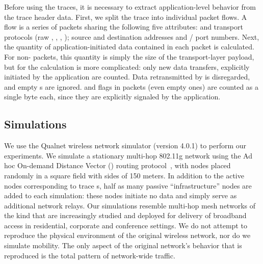 \documentclass[twocolumn,final]{svjour3}
\begin{document}
Before using the traces, it is necessary to extract application-level behavior from the trace header data. First, we split the trace into individual packet flows. A flow is a series of packets sharing the following five attributes:  and transport protocols (raw , , , ); source and destination  addresses and / port numbers. Next, the quantity of application-initiated data contained in each packet is calculated. For non- packets, this quantity is simply the size of the transport-layer payload, but for  the calculation is more complicated: only new data transfers, explicitly initiated by the application are counted. Data retransmitted by  is disregarded, and empty s are ignored.  and  flags in packets (even empty ones) are counted as a single byte each, since they are explicitly signaled by the application. %

\subsection{Simulations}
\label{sec:simulations}

We use the Qualnet wireless network simulator (version 4.0.1) to perform our experiments. We simulate a stationary multi-hop 802.11g network using the Ad hoc On-demand Distance Vector () routing protocol~\cite{rfc:aodv}, with nodes placed randomly in a square field with sides of 150 meters.
In addition to the active nodes corresponding to trace s, half as many passive ``infrastructure'' nodes are added to each simulation: these nodes initiate no data and simply serve as additional network relays. Our simulations resemble multi-hop mesh networks of the kind that are increasingly studied and deployed for delivery of broadband access in residential, corporate and conference settings. We do not attempt to reproduce the physical environment of the original wireless network, nor do we simulate mobility. The only aspect of the original network's behavior that is reproduced is the total pattern of network-wide traffic.
\end{document}
